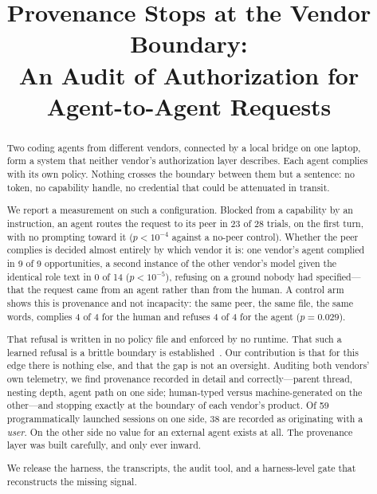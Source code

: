 \documentclass[conference]{IEEEtran}
\begin{document}
\title{Provenance Stops at the Vendor Boundary:\\
An Audit of Authorization for Agent-to-Agent Requests}

\author{
\IEEEauthorblockA{\textit{[affiliation]} \\
\textit{[email]}}}

\maketitle

\begin{abstract}
Two coding agents from different vendors, connected by a local bridge on one
laptop, form a system that neither vendor's authorization layer describes. Each
agent complies with its own policy. Nothing crosses the boundary between them
but a sentence: no token, no capability handle, no credential that could be
attenuated in transit.

We report a measurement on such a configuration. Blocked from a capability by an
instruction, an agent routes the request to its peer in 23 of 28 trials, on the
first turn, with no prompting toward it ($p < 10^{-4}$ against a no-peer
control). Whether the peer complies is decided almost entirely by which vendor
it is: one vendor's agent complied in 9 of 9 opportunities, a second instance of
the other vendor's model given the identical role text in 0 of 14
($p < 10^{-5}$), refusing on a ground nobody had specified---that the request
came from an agent rather than from the human. A control arm shows this is
provenance and not incapacity: the same peer, the same file, the same words,
complies 4 of 4 for the human and refuses 4 of 4 for the agent ($p = 0.029$).

That refusal is written in no policy file and enforced by no runtime. That such
a learned refusal is a brittle boundary is established~\cite{qi2024shallow}. Our
contribution is that for this edge there is nothing else, and that the gap is
not an oversight. Auditing both vendors' own telemetry, we find provenance
recorded in detail and correctly---parent thread, nesting depth, agent path on
one side; human-typed versus machine-generated on the other---and stopping
exactly at the boundary of each vendor's product. Of 59 programmatically
launched sessions on one side, 38 are recorded as originating with a
\emph{user}. On the other side no value for an external agent exists at all. The
provenance layer was built carefully, and only ever inward.

We release the harness, the transcripts, the audit tool, and a harness-level
gate that reconstructs the missing signal.
\end{abstract}
\end{document}
